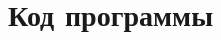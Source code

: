 \documentclass[a4paper]{article}
\begin{document}
\clearpage
\section{Код программы}\label{code}
\singlespace


\onehalfspacing
\end{document}
